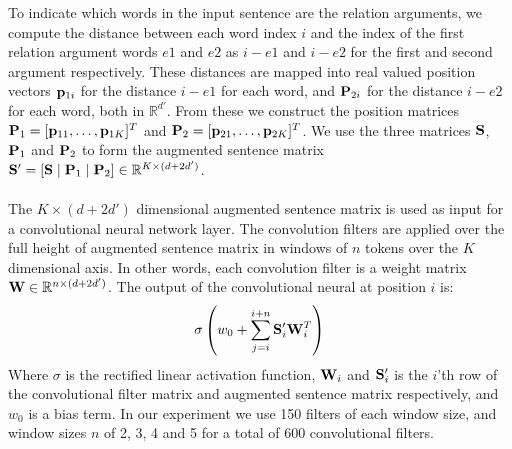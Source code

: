 To indicate which words in the input sentence are the relation arguments, we compute the distance between each word index $i$ and the index of the first relation argument words $e1$ and $e2$ as $i - e1$ and $i - e2$ for the first and second argument respectively. These distances are mapped into real valued position vectors $\mathbf{p}_{1i}$ for the distance $i - e1$ for each word, and $\mathbf{P}_{2i}$ for the distance $i - e2$ for each word, both in  $\mathbb{R}^{d'}$. From these we construct the position matrices $\mathbf{P}_1 = [\mathbf{p}_{11},\dots,\mathbf{p}_{1K}]^T$ and $\mathbf{P}_2 = [\mathbf{p}_{21},\dots,\mathbf{p}_{2K}]^T$. We use the three matrices $\mathbf{S}$, $\mathbf{P}_1$ and $\mathbf{P}_2$ to form the augmented sentence matrix $\mathbf{S}' = [\mathbf{S} \mid \mathbf{P}_1 \mid \mathbf{P}_2] \in \mathbb{R}^{K \times (d + 2d')}$.
\\\\
The $K \times (d + 2d')$ dimensional augmented sentence matrix is used as input for a convolutional neural network layer. The convolution filters are applied over the full height of augmented sentence matrix in windows of $n$ tokens over the $K$ dimensional axis. In other words, each convolution filter is a weight matrix $\mathbf{W} \in \mathbb{R}^{n \times (d + 2d')}$. The output of the convolutional neural at position $i$ is:
$$
\sigma\left(w_0 + \sum\limits_{j = i}^{i + n}\mathbf{S}'_i\mathbf{W}_i^T\right)
$$
Where $\sigma$ is the rectified linear activation function, $\mathbf{W}_i$ and $\mathbf{S}'_i$ is the $i$'th row of the convolutional filter matrix and augmented sentence matrix respectively, and $w_0$ is a bias term. In our experiment we use 150 filters of each window size, and window sizes $n$ of 2, 3, 4 and 5 for a total of 600 convolutional filters.

